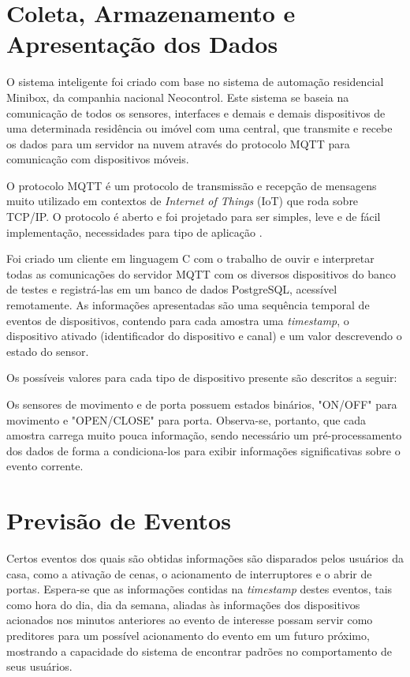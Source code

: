 \documentclass[
	12pt,				%
	openright,			%
	twoside,			%
	a4paper,			%
	english,			%
	spanish,			%
	brazil,				%
	]{abntex2}\usepackage[]{graphicx}\usepackage[]{color}
\begin{document}
\section{Coleta, Armazenamento e Apresentação dos Dados}

O sistema inteligente foi criado com base no sistema de automação residencial Minibox, da companhia nacional Neocontrol. Este sistema se baseia na comunicação de todos os sensores, interfaces e demais e demais dispositivos de uma determinada residência ou imóvel com uma central, que transmite e recebe os dados para um servidor na nuvem através do protocolo MQTT para comunicação com dispositivos móveis.

O protocolo MQTT é um protocolo de transmissão e recepção de mensagens muito utilizado em contextos de \textit{Internet of Things} (IoT) que roda sobre TCP/IP. O protocolo é aberto e foi projetado para ser simples, leve e de fácil implementação, necessidades para tipo de aplicação \cite{OASIS2014}.

Foi criado um cliente em linguagem C com o trabalho de ouvir e interpretar todas as comunicações do servidor MQTT com os diversos dispositivos do banco de testes e registrá-las em um banco de dados PostgreSQL, acessível remotamente.
As informações apresentadas são uma sequência temporal de eventos de dispositivos, contendo para cada amostra uma \textit{timestamp}, o dispositivo ativado (identificador do dispositivo e canal) e um valor descrevendo o estado do sensor. 

Os possíveis valores para cada tipo de dispositivo presente são descritos a seguir:

Os sensores de movimento e de porta possuem estados binários, "ON/OFF" para movimento e "OPEN/CLOSE" para porta. Observa-se, portanto, que cada amostra carrega muito pouca informação, sendo necessário um pré-processamento dos dados de forma a condiciona-los para exibir informações significativas sobre o evento corrente.

\section{Previsão de Eventos}

Certos eventos dos quais são obtidas informações são disparados pelos usuários da casa, como a ativação de cenas, o acionamento de interruptores e o abrir de portas. Espera-se que as informações contidas na \textit{timestamp} destes eventos, tais como hora do dia, dia da semana, aliadas às informações dos dispositivos acionados nos minutos anteriores ao evento de interesse possam servir como preditores para um possível acionamento do evento em um futuro próximo, mostrando a capacidade do sistema de encontrar padrões no comportamento de seus usuários.
\end{document}
